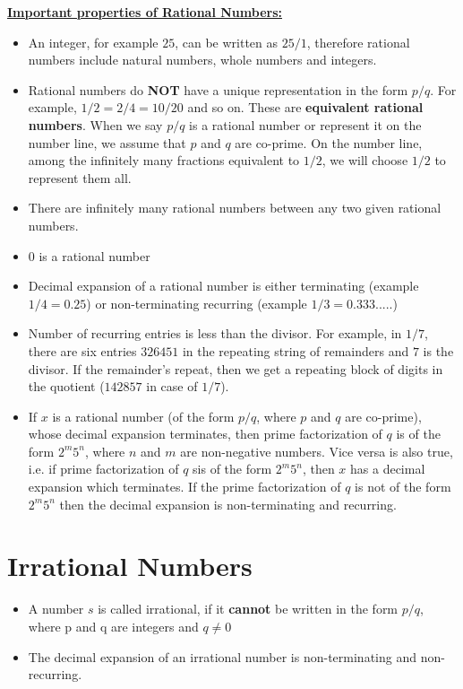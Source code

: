 \documentclass{book}
\begin{document}
	\underline{	\textbf{Important properties of Rational Numbers:}}
	\begin{itemize}
	\item An integer, for example $25$, can be written as $25/1$, therefore rational numbers include natural numbers, whole numbers and integers.
	\item Rational numbers do \textbf{NOT} have a unique representation in the form $p/q$. For example, $1/2 = 2/4 = 10/20$ and so on. These are \textbf{equivalent rational numbers}.  When we say $p/q$ is a rational number or represent it on the number line, we assume that $p$ and $q$ are co-prime. On the number line, among the infinitely many fractions equivalent to $1/2$, we will choose $1/2$ to represent them all.
	\item There are infinitely many rational numbers between any two given rational numbers.
	\item $0$ is a rational number
	\item Decimal expansion of a rational number is either terminating (example $1/4 = 0.25$) or non-terminating recurring (example $1/3 = 0.333.....$)
	\item Number of recurring entries is less than the divisor. For example, in $1/7$, there are six entries $326451$ in the repeating string of remainders and $7$ is the divisor. If the remainder's repeat, then we get a repeating block of digits in the quotient ($142857$ in case of $1/7$).
	\item If $x$ is a rational number (of the form $p/q$, where $p$ and $q$ are co-prime), whose decimal expansion terminates,  then prime factorization of $q$ is of the form $2^m5^n$, where $n$ and $m$ are non-negative numbers. Vice versa is also true, i.e. if prime factorization of  $q$ sis of the form $2^m5^n$, then $x$ has a decimal expansion which terminates. If the prime factorization of $q$  is not of the form $2^m5^n$ then the decimal expansion is non-terminating and recurring.
	\end{itemize}
	
	\section{Irrational Numbers}
	\begin{itemize}
	\item A number $s$ is called irrational, if it \textbf{cannot} be written in the form $p/q$, where p and q are integers and $q \neq 0$
	\item The decimal expansion of an irrational number is non-terminating and non-recurring.
	\end{itemize}
	
\end{document}
